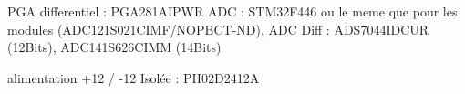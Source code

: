 PGA differentiel : PGA281AIPWR
ADC : STM32F446 ou le meme que pour les modules (ADC121S021CIMF/NOPBCT-ND), 
ADC Diff : ADS7044IDCUR (12Bits), ADC141S626CIMM (14Bits)

alimentation +12 / -12 Isolée : PH02D2412A


